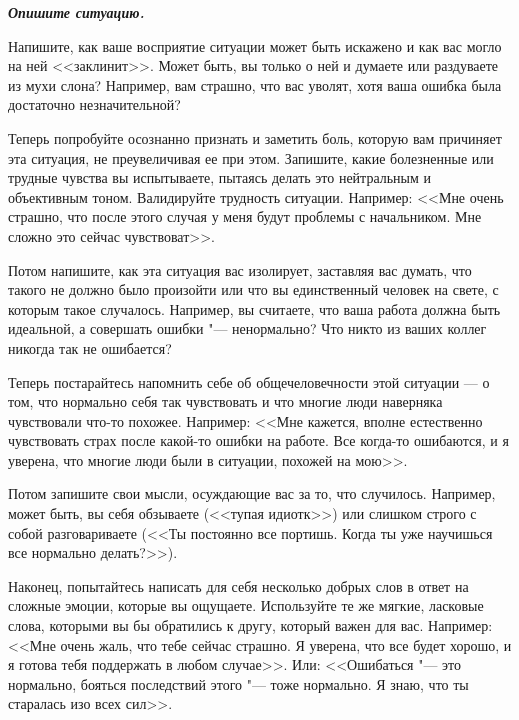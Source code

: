 \vspace{2ex}

\textbf{\textit{Опишите ситуацию.}}

\vfill

Напишите, как ваше восприятие ситуации может быть искажено и как вас могло на ней <<заклинит>>. Может быть, вы только о ней и думаете или раздуваете из мухи слона? Например, вам страшно, что вас уволят, хотя ваша ошибка была достаточно незначительной?

\vfill


\newpage


Теперь попробуйте осознанно признать и заметить боль, которую вам причиняет эта ситуация, не преувеличивая ее при этом. Запишите, какие болезненные или трудные чувства вы испытываете, пытаясь делать это нейтральным и объективным тоном. Валидируйте трудность ситуации. Например: <<Мне очень страшно, что после этого случая у меня будут проблемы с начальником.  Мне сложно это сейчас чувствоват>>.

\vfill

Потом напишите, как эта ситуация вас изолирует, заставляя вас думать, что такого не должно было произойти или что вы единственный человек на свете, с которым такое случалось. Например, вы считаете, что ваша работа должна быть идеальной, а совершать ошибки "--- ненормально? Что никто из ваших коллег никогда так не ошибается?

\vfill


\newpage


Теперь постарайтесь напомнить себе об общечеловечности этой ситуации --- о том, что нормально себя так чувствовать и что многие люди наверняка чувствовали что-то похожее. Например: <<Мне кажется, вполне естественно чувствовать страх после какой-то ошибки на работе. Все когда-то ошибаются, и я уверена, что многие люди были в ситуации, похожей на мою>>.

\vfill

Потом запишите свои мысли, осуждающие вас за то, что случилось. Например, может быть, вы себя обзываете (<<тупая идиотк>>) или слишком строго с собой разговариваете (<<Ты постоянно все портишь. Когда ты уже научишься все нормально делать?>>).

\vfill


\newpage


Наконец, попытайтесь написать для себя несколько добрых слов в ответ на сложные эмоции, которые вы ощущаете. Используйте те же мягкие, ласковые слова, которыми вы бы обратились к другу, который важен для вас. Например: <<Мне очень жаль, что тебе сейчас страшно. Я уверена, что все будет хорошо, и я готова тебя поддержать в любом случае>>. Или: <<Ошибаться "--- это нормально, бояться последствий этого "--- тоже нормально. Я знаю, что ты старалась изо всех сил>>.


